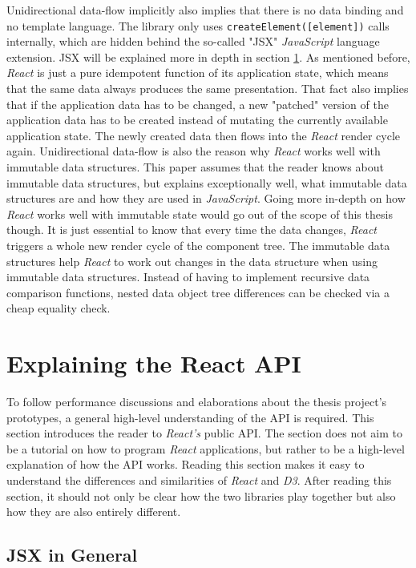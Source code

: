 Unidirectional data-flow implicitly also implies that there is no data binding and no template language. The library only uses \texttt{createElement([element])} calls internally, which are hidden behind the so-called "JSX" \emph{JavaScript} language extension. JSX will be explained more in depth in section \ref{sec:reactApi}. As mentioned before, \emph{React} is just a pure idempotent function of its application state, which means that the same data always produces the same presentation. That fact also implies that if the application data has to be changed, a new "patched" version of the application data has to be created instead of mutating the currently available application state. The newly created data then flows into the \emph{React} render cycle again. Unidirectional data-flow is also the reason why \emph{React} works well with immutable data structures. This paper assumes that the reader knows about immutable data structures, but \cite{ImmutableJS} explains exceptionally well, what immutable data structures are and how they are used in \emph{JavaScript}. Going more in-depth on how \emph{React} works well with immutable state would go out of the scope of this thesis though. It is just essential to know that every time the data changes, \emph{React} triggers a whole new render cycle of the component tree. The immutable data structures help \emph{React} to work out changes in the data structure when using immutable data structures. Instead of having to implement recursive data comparison functions, nested data object tree differences can be checked via a cheap equality check.

\section{Explaining the React API}
\label{sec:reactApi}

To follow performance discussions and elaborations about the thesis project's prototypes, a general high-level understanding of the API is required. This section introduces the reader to \emph{React's} public API. The section does not aim to be a tutorial on how to program \emph{React} applications, but rather to be a high-level explanation of how the API works. Reading this section makes it easy to understand the differences and similarities of \emph{React} and \emph{D3}. After reading this section, it should not only be clear how the two libraries play together but also how they are also entirely different.

\subsection{JSX in General}

